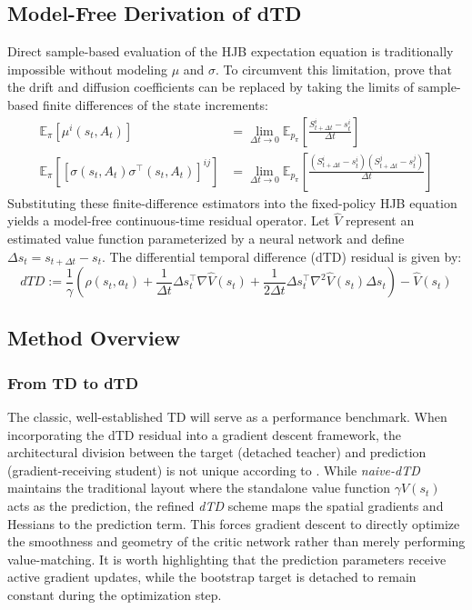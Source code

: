 \documentclass{article}
\begin{document}
\subsection{Model-Free Derivation of dTD}
Direct sample-based evaluation of the HJB expectation equation is traditionally impossible without modeling $\mu$ and $\sigma$. To circumvent this limitation, \citet{settai2025} prove that the drift and diffusion coefficients can be replaced by taking the limits of sample-based finite differences of the state increments:
\begin{align}
    \mathbb{E}_{\pi}[\mu^i(s_t, A_t)] &= \lim_{\Delta t \to 0} \mathbb{E}_{p_\pi} \left[ \frac{S^i_{t+\Delta t} - s^i_t}{\Delta t} \right] \\
    \mathbb{E}_{\pi}[[\sigma(s_t, A_t)\sigma^\top(s_t, A_t)]^{ij}] &= \lim_{\Delta t \to 0} \mathbb{E}_{p_\pi} \left[ \frac{(S^i_{t+\Delta t} - s^i_t)(S^j_{t+\Delta t} - s^j_t)}{\Delta t} \right]
\end{align}
Substituting these finite-difference estimators into the fixed-policy HJB equation yields a model-free continuous-time residual operator. Let $\hat{V}$ represent an estimated value function parameterized by a neural network and define $\Delta s_t = s_{t+\Delta t} - s_t$. The differential temporal difference (dTD) residual is given by:
\begin{equation}
    \label{eq:residual}
    dTD := \frac{1}{\gamma} \left( \rho(s_t, a_t) + \frac{1}{\Delta t}\Delta s_t^\top \nabla \hat{V}(s_t) + \frac{1}{2\Delta t} \Delta s_t^\top \nabla^2 \hat{V}(s_t) \Delta s_t \right) - \hat{V}(s_t)
\end{equation}

\subsection{Method Overview}
\subsubsection{From TD to dTD}
The classic, well-established TD will serve as a performance benchmark. When incorporating the dTD residual into a gradient descent framework, the architectural division between the target (detached teacher) and prediction (gradient-receiving student) is not unique according to \citet{settai2025}. While \textit{naive-dTD} maintains the traditional layout where the standalone value function $\gamma V(s_t)$ acts as the prediction, the refined \textit{dTD} scheme maps the spatial gradients and Hessians to the prediction term. This forces gradient descent to directly optimize the smoothness and geometry of the critic network rather than merely performing value-matching. It is worth highlighting that the prediction parameters receive active gradient updates, while the bootstrap target is detached to remain constant during the optimization step.
\end{document}
